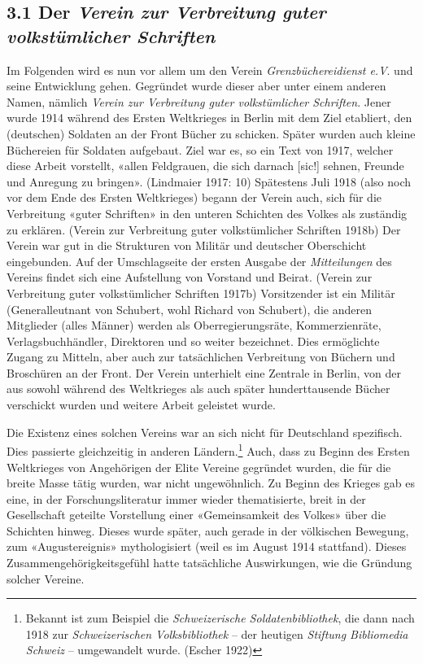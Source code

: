 \documentclass[a4paper,
fontsize=11pt,
oneside,
numbers=noperiodatend,
parskip=half-,
bibliography=totoc,
final
]{scrartcl}
\begin{document}
\hypertarget{der-verein-zur-verbreitung-guter-volkstuxfcmlicher-schriften}{%
\subsection{\texorpdfstring{3.1 Der \emph{Verein zur Verbreitung guter
volkstümlicher
Schriften}}{3.1 Der Verein zur Verbreitung guter volkstümlicher Schriften}}\label{der-verein-zur-verbreitung-guter-volkstuxfcmlicher-schriften}}

Im Folgenden wird es nun vor allem um den Verein
\emph{Grenzbüchereidienst e.V}. und seine Entwicklung gehen. Gegründet
wurde dieser aber unter einem anderen Namen, nämlich \emph{Verein zur
Verbreitung guter volkstümlicher Schriften}. Jener wurde 1914 während
des Ersten Weltkrieges in Berlin mit dem Ziel etabliert, den (deutschen)
Soldaten an der Front Bücher zu schicken. Später wurden auch kleine
Büchereien für Soldaten aufgebaut. Ziel war es, so ein Text von 1917,
welcher diese Arbeit vorstellt, «allen Feldgrauen, die sich darnach
{[}sic!{]} sehnen, Freunde und Anregung zu bringen». (Lindmaier 1917:
10) Spätestens Juli 1918 (also noch vor dem Ende des Ersten Weltkrieges)
begann der Verein auch, sich für die Verbreitung «guter Schriften» in
den unteren Schichten des Volkes als zuständig zu erklären. (Verein zur
Verbreitung guter volkstümlicher Schriften 1918b) Der Verein war gut in
die Strukturen von Militär und deutscher Oberschicht eingebunden. Auf
der Umschlagseite der ersten Ausgabe der \emph{Mitteilungen} des Vereins
findet sich eine Aufstellung von Vorstand und Beirat. (Verein zur
Verbreitung guter volkstümlicher Schriften 1917b) Vorsitzender ist ein
Militär (Generalleutnant von Schubert, wohl Richard von Schubert), die
anderen Mitglieder (alles Männer) werden als Oberregierungsräte,
Kommerzienräte, Verlagsbuchhändler, Direktoren und so weiter bezeichnet.
Dies ermöglichte Zugang zu Mitteln, aber auch zur tatsächlichen
Verbreitung von Büchern und Broschüren an der Front. Der Verein
unterhielt eine Zentrale in Berlin, von der aus sowohl während des
Weltkrieges als auch später hunderttausende Bücher verschickt wurden und
weitere Arbeit geleistet wurde.

Die Existenz eines solchen Vereins war an sich nicht für Deutschland
spezifisch. Dies passierte gleichzeitig in anderen Ländern.\footnote{Bekannt
  ist zum Beispiel die \emph{Schweizerische Soldatenbibliothek}, die
  dann nach 1918 zur \emph{Schweizerischen Volksbibliothek} -- der
  heutigen \emph{Stiftung Bibliomedia Schweiz} -- umgewandelt wurde.
  (Escher 1922)} Auch, dass zu Beginn des Ersten Weltkrieges von
Angehörigen der Elite Vereine gegründet wurden, die für die breite Masse
tätig wurden, war nicht ungewöhnlich. Zu Beginn des Krieges gab es eine,
in der Forschungsliteratur immer wieder thematisierte, breit in der
Gesellschaft geteilte Vorstellung einer «Gemeinsamkeit des Volkes» über
die Schichten hinweg. Dieses wurde später, auch gerade in der völkischen
Bewegung, zum «Augustereignis» mythologisiert (weil es im August 1914
stattfand). Dieses Zusammengehörigkeitsgefühl hatte tatsächliche
Auswirkungen, wie die Gründung solcher Vereine.
\end{document}
